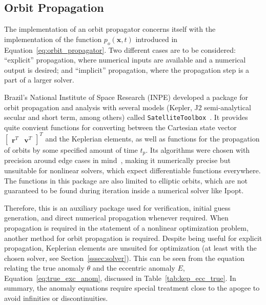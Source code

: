 \subsection{Orbit Propagation}\label{sec:orbit_propagation}

The implementation of an orbit propagator concerns itself with the implementation of the function \(p_o(\mathbf{x}, t)\) introduced in Equation~\eqref{eq:orbit_propagator}. Two different cases are to be considered: ``explicit'' propagation, where numerical inputs are available and a numerical output is desired; and ``implicit'' propagation, where the propagation step is a part of a larger solver.

Brazil's National Institute of Space Research (INPE) developed a package for orbit propagation and analysis with several models (Kepler, J2 semi-analytical secular and short term, among others) called \texttt{SatelliteToolbox}~\cite{satellitetoolbox}. It provides quite convient functions for converting between the Cartesian state vector \(\begin{bmatrix}
    \mathbf{r}^T & \mathbf{v}^T
\end{bmatrix}^T\) and the Keplerian elements, as well as functions for the propagation of orbits by some specified amount of time \(t_p\). Its algorithms were chosen with precision around edge cases in mind~\cite{rv_to_kepler}, making it numerically precise but unsuitable for nonlinear solvers, which expect differentiable functions everywhere. The functions in this package are also limited to elliptic orbits, which are not guaranteed to be found during iteration inside a numerical solver like Ipopt.

Therefore, this is an auxiliary package used for verification, initial guess generation, and direct numerical propagation whenever required. When propagation is required in the statement of a nonlinear optimization problem, another method for orbit propagation is required. Despite being useful for explicit propagation, Keplerian elements are unsuited for optimization (at least with the chosen solver, see Section~\ref{sssec:solver}). This can be seen from the equation relating the true anomaly \(\theta\) and the eccentric anomaly \(E\), Equation~\eqref{eq:true_exc_anom}, discussed in Table~\ref{tab:kep_ecc_true}. In summary, the anomaly equations require special treatment close to the apogee to avoid infinities or discontinuities.

